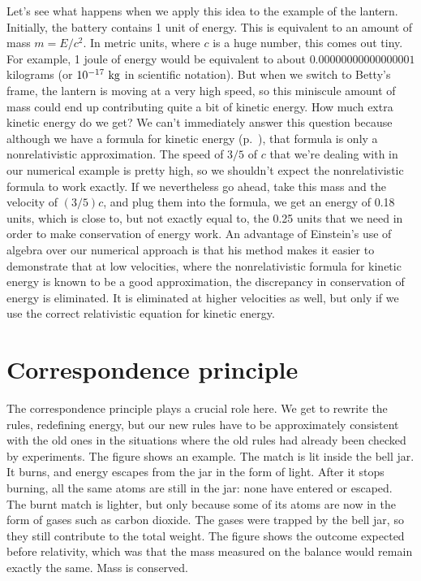 Let's see what happens when we apply this idea to the example of the lantern. Initially, the battery contains
1 unit of energy. This is equivalent to an amount of mass $m=E/c^2$. In metric units, where $c$ is a huge number,
this comes out tiny. For example, 1 joule of energy would be equivalent to about $0.00000000000000001$ kilograms (or
$10^{-17}\ \textup{kg}$ in scientific notation). But when we switch to Betty's frame, the lantern is moving at a
very high speed, so this miniscule amount of mass could end up contributing quite a bit of kinetic energy.
How much extra kinetic energy do we get? We can't immediately answer this question because although we have
a formula for kinetic energy (p.~\pageref{ke-formula}), that formula is only a nonrelativistic approximation.
The speed of $3/5$ of $c$ that we're dealing with in our numerical example is pretty high, so we shouldn't
expect the nonrelativistic formula to work exactly. 
If we nevertheless go ahead, take this mass and the velocity of $(3/5)c$, and plug them
into the formula, we get an energy of 0.18 units, which is close to, but not exactly equal to, the 0.25
units that we need in order to make conservation of energy work. An advantage of Einstein's use of algebra
over our numerical approach is that his method makes it easier to demonstrate that at low velocities, where
the nonrelativistic formula for kinetic energy is known to be a good approximation, the discrepancy in
conservation of energy is eliminated. It is eliminated at higher velocities as well, but only if we use
the correct relativistic equation for kinetic energy.

\section{Correspondence principle}


The correspondence principle plays a crucial role here. We get to rewrite the rules, redefining
energy, but our new rules have to be approximately consistent with the old ones in the situations where the old
rules had already been checked by experiments. The figure shows an example.
The match is lit inside the bell jar. It burns, and energy escapes from the jar
in the form of light. After it stops burning, all the same atoms are still in the
jar: none have entered or escaped. The burnt match is lighter, but only because some of its
atoms are now in the form of gases such as carbon dioxide. The gases were trapped by the bell jar,
so they still contribute to the total weight. The figure shows the outcome expected before
relativity, which was that the mass measured on the balance would remain exactly the same.
Mass is conserved.

